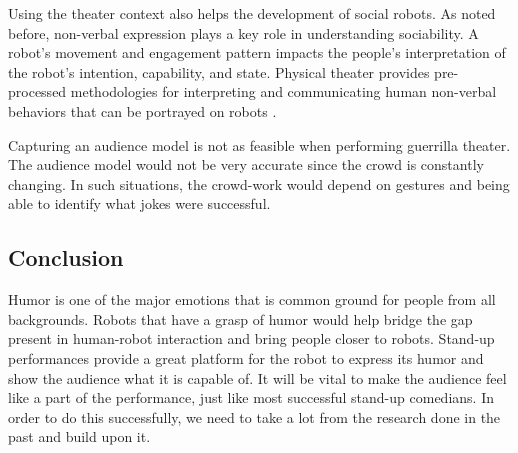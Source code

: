 Using the theater context also helps the development of social robots. As noted before, non-verbal expression plays a key role in understanding sociability. A robot's movement and engagement pattern impacts the people's interpretation of the robot's intention, capability, and state. Physical theater provides pre-processed methodologies for interpreting and communicating human non-verbal behaviors that can be portrayed on robots \cite{KnightEightLessons:2011}.

Capturing an audience model is not as feasible when performing guerrilla theater. The audience model would not be very accurate since the crowd is constantly changing. In such situations, the crowd-work would depend on gestures and being able to identify what jokes were successful.

\subsection{Conclusion}

Humor is one of the major emotions that is common ground for people from all backgrounds. Robots that have a grasp of humor would help bridge the gap present in human-robot interaction and bring people closer to robots. Stand-up performances provide a great platform for the robot to express its humor and show the audience what it is capable of. It will be vital to make the audience feel like a part of the performance, just like most successful stand-up comedians. In order to do this successfully, we need to take a lot from the research done in the past and build upon it.
